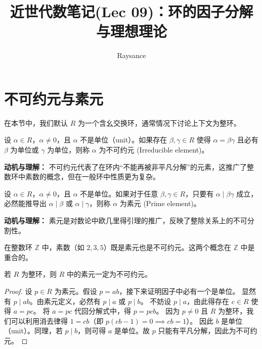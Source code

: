 \documentclass[11pt]{article}
\title{近世代数笔记(Lec 09)：环的因子分解与理想理论}
\author{Raysance}
\date{}
\begin{document}
\maketitle


\section{不可约元与素元}
在本节中，我们默认 $R$ 为一个含幺交换环，通常情况下讨论上下文为整环。

\begin{cndefinition}[不可约元]
设 $\alpha \in R$，$\alpha \neq 0$，且 $\alpha$ 不是单位（unit）。如果存在 $\beta, \gamma \in R$ 使得 $\alpha = \beta \gamma$ 且必有 $\beta$ 为单位或 $\gamma$ 为单位，则称 $\alpha$ 为不可约元 (Irreducible element)。
\end{cndefinition}
\noindent \textbf{动机与理解：} 不可约元代表了在环内“不能再被非平凡分解”的元素，这推广了整数环中素数的概念，但在一般环中性质更为复杂。

\begin{cndefinition}[素元]
设 $\alpha \in R$，$\alpha \neq 0$，且 $\alpha$ 不是单位。如果对于任意 $\beta, \gamma \in R$，只要有 $\alpha \mid \beta\gamma$ 成立，必然能推导出 $\alpha \mid \beta$ 或 $\alpha \mid \gamma$，则称 $\alpha$ 为素元 (Prime element)。
\end{cndefinition}
\noindent \textbf{动机与理解：} 素元是对数论中欧几里得引理的推广，反映了整除关系上的不可分割性。

\begin{cnexample}
在整数环 $\mathbb{Z}$ 中，素数（如 $2,3,5$）既是素元也是不可约元。这两个概念在 $\mathbb{Z}$ 中是重合的。
\end{cnexample}

\begin{cnproperty}
若 $R$ 为整环，则 $R$ 中的素元一定为不可约元。
\end{cnproperty}
\begin{proof}
设 $p \in R$ 为素元。假设 $p = ab$，接下来证明因子中必有一个是单位。
显然有 $p \mid ab$。由素元定义，必然有 $p \mid a$ 或 $p \mid b$。
不妨设 $p \mid a$，由此得存在 $c \in R$ 使得 $a = pc$。
将 $a = pc$ 代回分解式中，得 $p = pcb$。
因为 $p \neq 0$ 且 $R$ 为整环，我们可以利用消去律得 $1 = cb$（即 $p(cb - 1) = 0 \implies cb = 1$）。
因此 $b$ 是单位（unit）。同理，若 $p \mid b$，则可得 $a$ 是单位。故 $p$ 只能有平凡分解，因此为不可约元。
\end{proof}
\end{document}
